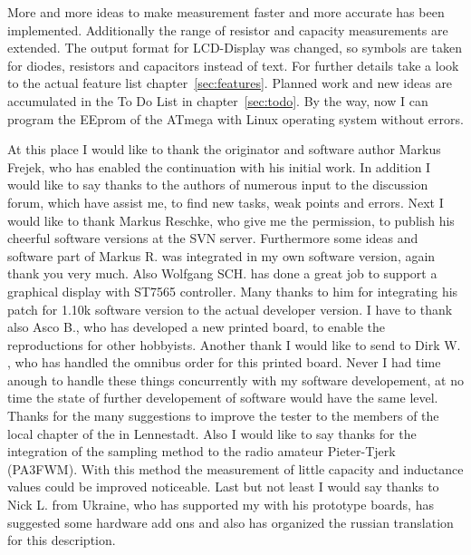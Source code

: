 More and more ideas to make measurement faster and more accurate has been implemented.
Additionally the range of resistor and capacity measurements are extended.
The output format for LCD-Display was changed, so symbols are taken for diodes, resistors and capacitors instead of text.
For further details take a look to the actual feature list chapter~\ref{sec:features}.
Planned work and new ideas are accumulated in the To Do List in chapter~\ref{sec:todo}.
By the way, now I can program the EEprom of the ATmega with Linux operating system without errors.

At this place I would like to thank the originator and software author Markus Frejek, who has enabled the continuation
with his initial work.
In addition I would like to say thanks to the authors of numerous input to the discussion forum, which have assist me, to
find new tasks, weak points and errors.
Next I would like to thank Markus Reschke, who give me the permission, to publish his cheerful software versions at the
SVN server. Furthermore some ideas and software part of Markus R. was integrated in my own software version,
again thank you very much.
Also Wolfgang SCH. has done a great job to support a graphical display with ST7565 controller. Many thanks to him
for integrating his patch for 1.10k software version to the actual developer version.
I have to thank also Asco B., who has developed a new printed board, to enable the reproductions for other hobbyists.
Another thank I would like to send to Dirk W. , who has handled the omnibus order for this printed board.
Never I had time anough to handle these things concurrently with my software developement, at no time the state of further
developement of software would have the same level.
Thanks for the many suggestions to improve the tester to the members of the local chapter of the 
in Lennestadt.
Also I would like to say thanks for the integration of the sampling method to the radio amateur Pieter-Tjerk (PA3FWM).
With this method the measurement of little capacity and inductance values could be improved noticeable.
Last but not least I would say thanks to Nick L. from Ukraine, who has supported my with his prototype boards, 
has suggested some hardware add ons and also has organized the russian translation for this description.

